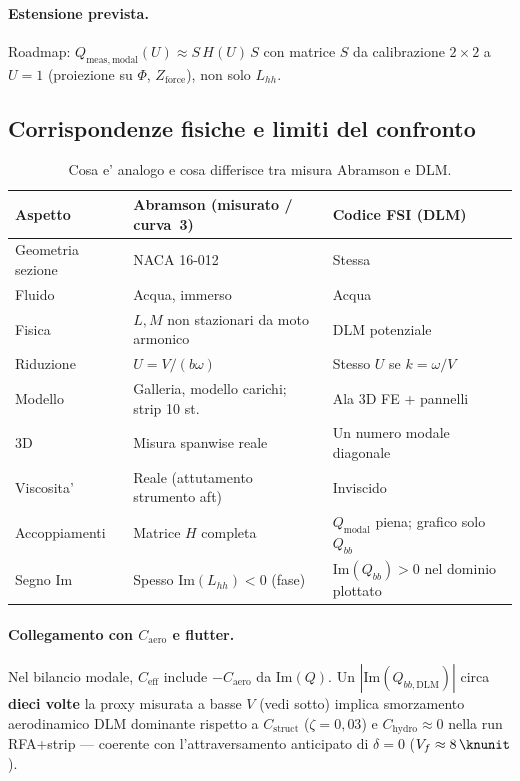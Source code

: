 \documentclass[11pt,a4paper]{article}
\begin{document}
\paragraph{Estensione prevista.}
Roadmap: $Q_\mathrm{meas,modal}(U)\approx S\,H(U)\,S$ con matrice $S$ da calibrazione
$2\times2$ a $U=1$ (proiezione su $\Phi$, $Z_\mathrm{force}$), non solo $L_{hh}$.

\subsection{Corrispondenze fisiche e limiti del confronto}

\begin{table}[H]
  \centering
  \caption{Cosa e' analogo e cosa differisce tra misura Abramson e DLM.}
  \label{tab:analogy-limits}
  \begin{tabular}{p{3.2cm}p{4.8cm}p{4.8cm}}
    \toprule
    Aspetto & Abramson (misurato / curva~3) & Codice FSI (DLM) \\
    \midrule
    Geometria sezione & NACA 16-012 & Stessa \\
    Fluido & Acqua, immerso & Acqua \\
    Fisica & $L,M$ non stazionari da moto armonico & DLM potenziale \\
    Riduzione & $U=V/(b\omega)$ & Stesso $U$ se $k=\omega/V$ \\
    Modello & Galleria, modello carichi; strip 10 st. & Ala 3D FE + pannelli \\
    3D & Misura spanwise reale & Un numero modale diagonale \\
    Viscosita' & Reale (attutamento strumento aft) & Inviscido \\
    Accoppiamenti & Matrice $H$ completa & $Q_\mathrm{modal}$ piena; grafico solo $Q_{bb}$ \\
    Segno $\mathrm{Im}$ & Spesso $\mathrm{Im}(L_{hh})<0$ (fase) & $\mathrm{Im}(Q_{bb})>0$ nel dominio plottato \\
    \bottomrule
  \end{tabular}
\end{table}

\paragraph{Collegamento con $C_\mathrm{aero}$ e flutter.}
Nel bilancio modale, $C_\mathrm{eff}$ include $-C_\mathrm{aero}$ da $\mathrm{Im}(Q)$.
Un $|\mathrm{Im}(Q_{bb,\mathrm{DLM}})|$ circa \textbf{dieci volte} la proxy misurata a basse
$V$ (vedi sotto) implica smorzamento aerodinamico DLM dominante rispetto a
$C_\mathrm{struct}$ ($\zeta=0{,}03$) e $C_\mathrm{hydro}\approx 0$ nella run RFA+strip ---
coerente con l'attraversamento anticipato di $\delta=0$ ($V_f\approx\SI{8}{\knunit}$).
\end{document}
